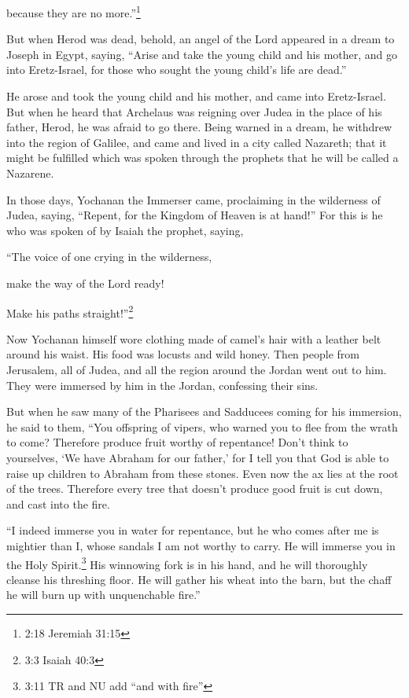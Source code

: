 because they are no more.”\footnote{2:18 Jeremiah 31:15}

\myverse{}But when Herod was dead, behold, an angel of the Lord appeared
in a dream to Joseph in Egypt, saying,
\myverse{}“Arise and take the young child and his mother, and go into Eretz-Israel,
for those who sought the young child’s life are dead.”

\myverse{}He arose and took the young child and his mother, and came into
Eretz-Israel.
\myverse{}But when he heard that Archelaus was reigning over Judea in the place of his
father, Herod, he was afraid to go there. Being warned in a dream, he withdrew into the region of Galilee,
\myverse{}and came and lived in a city called Nazareth; that it might be fulfilled which
was spoken through the prophets that he will be called a Nazarene.


\mychapter{} \myverse*{}In those days, Yochanan the Immerser came, proclaiming in the wilderness
of Judea, saying,
\myverse{}“Repent, for the Kingdom of Heaven is at hand!”
\myverse{}For this is he who was spoken of by Isaiah the prophet, saying,

“The voice of one crying in the wilderness,

make the way of the Lord ready!

Make his paths straight!”\footnote{3:3 Isaiah 40:3}

\myverse{}Now Yochanan himself wore clothing made of camel’s hair with a
leather belt around his waist. His food was locusts and wild honey.
\myverse{}Then people from Jerusalem, all of Judea, and all the region around the Jordan
went out to him.
\myverse{}They were immersed by him in the Jordan, confessing their sins.

\myverse{}But when he saw many of the Pharisees and Sadducees coming for
his immersion, he said to them, “You offspring of vipers, who warned you to flee from the wrath to come?
\myverse{}Therefore produce fruit worthy of repentance!
\myverse{}Don’t think to yourselves, ‘We have Abraham for our father,’ for I tell you
that God is able to raise up children to Abraham from these stones.
\myverse{}Even now the ax lies at the root of the trees. Therefore every tree that doesn’t
produce good fruit is cut down, and cast into the fire.

\myverse{}“I indeed immerse you in water for repentance, but he who comes
after me is mightier than I, whose sandals I am not worthy to carry. He will immerse you in the Holy Spirit.\footnote{3:11 TR and NU add “and with fire”
}
\myverse{}His winnowing fork is in his hand, and he will thoroughly cleanse his threshing
floor. He will gather his wheat into the barn, but the chaff he will burn up with unquenchable fire.”

